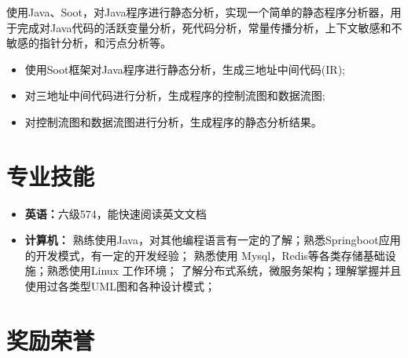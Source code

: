 \documentclass{resume}
\begin{document}


\Contents
{使用Java、Soot，对Java程序进行静态分析，实现一个简单的静态程序分析器，用于完成对Java代码的活跃变量分析，死代码分析，常量传播分析，上下文敏感和不敏感的指针分析，和污点分析等。}
{\begin{itemize}
    \item 使用Soot框架对Java程序进行静态分析，生成三地址中间代码(IR);
    \item 对三地址中间代码进行分析，生成程序的控制流图和数据流图;
    \item 对控制流图和数据流图进行分析，生成程序的静态分析结果。
\end{itemize} }
\sepspace

\section{专业技能}
\begin{itemize}
    \item \textbf{英语：}{六级574，能快速阅读英文文档}
    \item \textbf{计算机：}
    {熟练使用Java，对其他编程语言有一定的了解；熟悉Springboot应用的开发模式，有一定的开发经验；
    熟悉使用 Mysql，Redis等各类存储基础设施；熟悉使用Linux 工作环境；
    了解分布式系统，微服务架构；理解掌握并且使用过各类型UML图和各种设计模式；}
\end{itemize}
\sepspace

\section{奖励荣誉}
\end{document}
